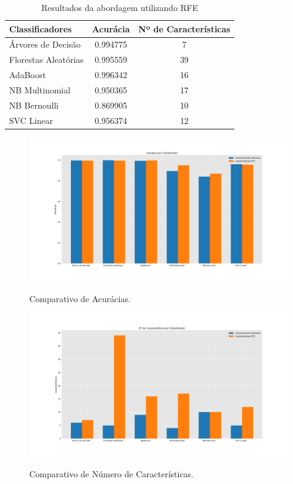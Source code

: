 \begin{table}[h!]
  \begin{center}
    \caption{Resultados da abordagem utilizando RFE}
    \label{r.t2}
    \begin{tabular}{l|c|c} %
      \textbf{Classificadores} & \textbf{Acurácia} & \textbf{Nº de Características}\\
      \hline
      Árvores de Decisão & 0.994775 & 7\\
      Florestas Aleatórias & 0.995559 & 39\\
      AdaBoost & 0.996342 & 16\\
      NB Multinomial & 0.950365 & 17\\
      NB Bernoulli & 0.869905 & 10\\
      SVC Linear & 0.956374 & 12\\
    \end{tabular}
  \end{center}
\end{table}

\begin{figure}[h]
\caption{Comparativo de Acurácias.}
\centering
\includegraphics[scale=0.35]{figs/ComparativoAcuracias.png}
\label{r.graf1}
\end{figure}

\begin{figure}[h]
\caption{Comparativo de Número de Características.}
\centering
\includegraphics[scale=0.40]{figs/ComparativoCaracs.png}
\label{r.graf2}
\end{figure}

